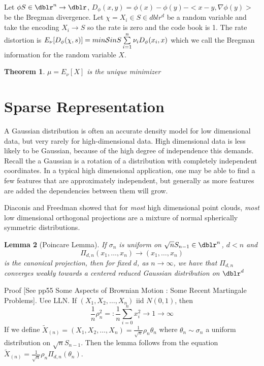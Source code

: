 \documentclass[a4paper]{article}
\newcommand{\s}{{\cal S}}
\theoremstyle{plain}
\newtheorem{thm}{Theorem}[section]
\newtheorem{lem}[thm]{Lemma}
\theoremstyle{definition}
\theoremstyle{remark}
\numberwithin{equation}{section}
\begin{document}
Let $\phi S \in \dblr^n \to \dblr$, $D_\phi (x,y) = \phi(x) - \phi(y) - < x-y, \nabla \phi(y) >$ be the Bregman divergence. Let $\chi = {X_i} \in S \in dblr^d$ be a random variable and take the encoding $X_i \to S$ so the rate is zero and the code book is 1. The rate distortion is $E_\nu [D_\phi (\chi,s)] = min \s in S \sum\limits_{i=1}^{n} \nu_i D_\phi (x_i,x)$ which we call the Bregman information for the random variable $X$.
\begin{thm}
$\mu = E_\nu [X]$ is the unique minimizer
\end{thm}


\section{Sparse Representation}
A Gaussian distribution is often an accurate density model for low dimensional data, but very rarely for high-dimensional data. High dimensional data is less likely to be Gaussian, because of the high degree of independence this demands.  Recall the a Gaussian is a rotation of a distribution with completely independent coordinates. In a typical high dimensional application, one may be able to find a few features that are approximately independent, but generally as more features are added the dependencies between them will grow.

Diaconis and Freedman showed that for \textit{most} high dimensional point clouds, \textit{most} low dimensional orthogonal projections are a mixture of normal spherically symmetric distributions.

\begin{lem}[Poincare Lemma]
If $\sigma_n$ is uniform on $\sqrt{n}S_{n-1} \in \dblr^n$,  $d<n$ and
\begin{equation*}
\Pi_{d,n} ( x_1, \hdots , x_n) \rightarrow ( x_1, \hdots , x_n)
\end{equation*}
is the canonical projection, then for fixed $d$, as $ n \rightarrow \infty $, we have that
$\Pi_{d,n}$ converges weakly towards a centered reduced Gaussian distribution on $\dblr^d$
\end{lem}

Proof [See pp55 Some Aspects of Brownian Motion : Some Recent Martingale Problems].
Uee LLN.  If $(X_1,X_2, \hdots ,X_n)$ iid $N(0,1)$, then
\begin{equation*}
\frac{1}{n} \rho_{n}^{2} =: \frac{1}{n} \sum_{i=0}^{n} x_{i}^{2} \rightarrow 1  \rightarrow \infty
\end{equation*}
If we define $\tilde{X}_{(n)} = (X_1,X_2, \hdots ,X_n) = \frac{1}{\sqrt{n}} \rho_n \theta_n$ where $\theta_n \sim \sigma_n$ a uniform distribution on $\sqrt{n}S_{n-1}$.  Then the lemma follows from the equation $\tilde{X}_{(n)} = \frac{1}{\sqrt{n}} \rho_n  \Pi_{d,n} (\theta_n)$.
\end{document}
